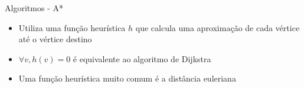 \begin{frame}{Algoritmos - A*}
    \begin{itemize}
        \item Utiliza uma função heurística $h$ que calcula uma aproximação de cada vértice até o vértice destino
        \item $\forall v, h(v) = 0$ é equivalente ao algoritmo de Dijkstra
        \item Uma função heurística muito comum é a distância euleriana
    \end{itemize}
\end{frame}